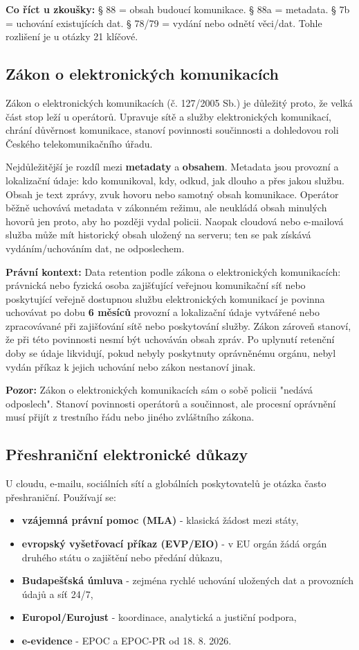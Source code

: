 \documentclass[11pt,a4paper]{article}
\newcommand{\zkouska}[1]{\begin{tcolorbox}[breakable,enhanced,colback=blue!7,colframe=blue!30!black,boxrule=0pt,arc=1mm,left=5pt,right=5pt,top=5pt,bottom=5pt,before skip=6pt,after skip=6pt]\textbf{Co říct u zkoušky:} #1\end{tcolorbox}}
\newcommand{\pozor}[1]{\begin{tcolorbox}[breakable,enhanced,colback=red!7,colframe=red!30!black,boxrule=0pt,arc=1mm,left=5pt,right=5pt,top=5pt,bottom=5pt,before skip=6pt,after skip=6pt]\textbf{Pozor:} #1\end{tcolorbox}}
\newcommand{\pravobox}[1]{\begin{tcolorbox}[breakable,enhanced,colback=yellow!18,colframe=yellow!45!black,boxrule=0pt,arc=1mm,left=5pt,right=5pt,top=5pt,bottom=5pt,before skip=6pt,after skip=6pt]\textbf{Právní kontext:} #1\end{tcolorbox}}
\begin{document}
\zkouska{§ 88 = obsah budoucí komunikace. § 88a = metadata. § 7b = uchování existujících dat. § 78/79 = vydání nebo odnětí věci/dat. Tohle rozlišení je u otázky 21 klíčové.}

\subsection*{Zákon o elektronických komunikacích}
Zákon o elektronických komunikacích (č. 127/2005 Sb.) je důležitý proto, že velká část stop leží u operátorů. Upravuje sítě a služby elektronických komunikací, chrání důvěrnost komunikace, stanoví povinnosti součinnosti a dohledovou roli Českého telekomunikačního úřadu.

Nejdůležitější je rozdíl mezi \textbf{metadaty} a \textbf{obsahem}. Metadata jsou provozní a lokalizační údaje: kdo komunikoval, kdy, odkud, jak dlouho a přes jakou službu. Obsah je text zprávy, zvuk hovoru nebo samotný obsah komunikace. Operátor běžně uchovává metadata v zákonném režimu, ale neukládá obsah minulých hovorů jen proto, aby ho později vydal policii. Naopak cloudová nebo e-mailová služba může mít historický obsah uložený na serveru; ten se pak získává vydáním/uchováním dat, ne odposlechem.

\pravobox{Data retention podle zákona o elektronických komunikacích: právnická nebo fyzická osoba zajišťující veřejnou komunikační síť nebo poskytující veřejně dostupnou službu elektronických komunikací je povinna uchovávat po dobu \textbf{6 měsíců} provozní a lokalizační údaje vytvářené nebo zpracovávané při zajišťování sítě nebo poskytování služby. Zákon zároveň stanoví, že při této povinnosti nesmí být uchováván obsah zpráv. Po uplynutí retenční doby se údaje likvidují, pokud nebyly poskytnuty oprávněnému orgánu, nebyl vydán příkaz k jejich uchování nebo zákon nestanoví jinak.}

\pozor{Zákon o elektronických komunikacích sám o sobě policii "nedává odposlech". Stanoví povinnosti operátorů a součinnost, ale procesní oprávnění musí přijít z trestního řádu nebo jiného zvláštního zákona.}

\subsection*{Přeshraniční elektronické důkazy}
U cloudu, e-mailu, sociálních sítí a globálních poskytovatelů je otázka často přeshraniční. Používají se:
\begin{itemize}
  \item \textbf{vzájemná právní pomoc (MLA)} - klasická žádost mezi státy,
  \item \textbf{evropský vyšetřovací příkaz (EVP/EIO)} - v EU orgán žádá orgán druhého státu o zajištění nebo předání důkazu,
  \item \textbf{Budapešťská úmluva} - zejména rychlé uchování uložených dat a provozních údajů a síť 24/7,
  \item \textbf{Europol/Eurojust} - koordinace, analytická a justiční podpora,
  \item \textbf{e-evidence} - EPOC a EPOC-PR od 18. 8. 2026.
\end{itemize}
\end{document}
